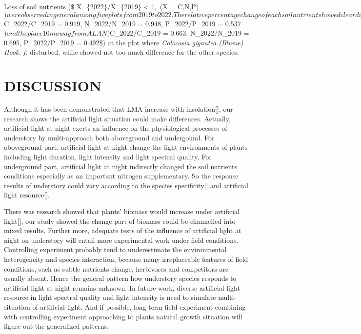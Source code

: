 \documentclass[
]{article}
\begin{document}
Loss of soil nutrients (\$ X\_\{2022\}/X\_\{2019\} \textless{} 1,~(X =
C,N,P)
\() were observed in general among five plots from 2019 to 2022. The relative percentage change of each soil nutrient showed clear difference between the place under ALAN (\)C\_2022/C\_2019
= 0.919, N\_2022/N\_2019 = 0.948, P\_2022/P\_2019 =
0.537\() and the place 10m away from ALAN (\)C\_2022/C\_2019 = 0.663,
N\_2022/N\_2019 = 0.695, P\_2022/P\_2019 = 0.492\$) at the plot where
\emph{Colocasia gigantea (Blume) Hook. f.} disturbed, while showed not
too much difference for the other species.

\hypertarget{discussion}{%
\section{DISCUSSION}\label{discussion}}

Although it has been demonstrated that LMA increase with
insolation{[}{]}, our research shows the artificial light situation
could make differences. Actually, artificial light at night exerts an
influence on the physiological processes of understory by multi-approach
both aboveground and undergound. For aboveground part, artificial light
at night change the light environments of plants including light
duration, light intensity and light spectral quality. For underground
part, artificial light at night indirectly changed the soil nutrients
conditions especially as an important nitrogen supplementary. So the
response results of understory could vary according to the species
specificity{[}{]} and artificial light resource{[}{]}.

There was research showed that plants' biomass would increase under
artificial light{[}{]}, our study showed the change part of biomass
could be channelled into mixed results. Further more, adequate tests of
the influence of artificial light at night on understory will entail
more experimental work under field conditions. Controlling experiment
probably tend to underestimate the environmental heterogeneity and
species interaction, because many irreplaceable features of field
conditions, such as subtle nutrients change, herbivores and competitors
are usually absent. Hence the general pattern how understory species
responds to artificial light at night remains unknown. In future work,
diverse artificial light resource in light spectral quality and light
intensity is need to simulate multi-situation of artificial light. And
if possible, long term field experiment combining with controlling
experiment approaching to plants natural growth situation will figure
out the generalized patterns.
\end{document}
